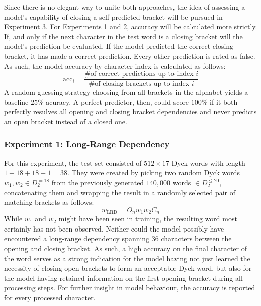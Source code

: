 Since there is no elegant way to unite both approaches, the idea of assessing a model's capability of closing a self-predicted bracket will be pursued in Experiment 3. For Experiments 1 and 2, accuracy will be calculated more strictly. If, and only if the next character in the test word is a closing bracket will the model's prediction be evaluated. If the model predicted the correct closing bracket, it has made a correct prediction. Every other prediction is rated as false. As such, the model accuracy by character index is calculated as follows:
\[
	\text{acc}_{i} = \frac{\text{\# of correct predictions up to index }i}{\text{\# of closing brackets up to index }i}
\]
A random guessing strategy choosing from all brackets in the alphabet yields a baseline $25\%$ acuracy. A perfect predictor, then, could score $100\%$ if it both perfectly resulves all opening and closing bracket dependencies and never predicts an open bracket instead of a closed one.

\subsubsection{Experiment 1: Long-Range Dependency}\label{LRD}
For this experiment, the test set consisted of $512 \times 17$ Dyck words with length $1+18+18+1=38$. They were created by picking two random Dyck words $w_{1}, w_{2} \in D_{2}^{=18}$ from the previously generated $140,000$ words $\in D_{2}^{\leq 20}$, concatenating them and wrapping the result in a randomly selected pair of matching brackets as follows:
\[
	w_{\text{LRD}} = O_{n}w_{1}w_{2}C_{n}
\]
While $w_{1}$ and $w_{2}$ might have been seen in training, the resulting word most certainly has not been observed. Neither could the model possibly have encountered a long-range dependency spanning $36$ characters between the opening and closing bracket. As such, a high accuracy on the final character of the word serves as a strong indication for the model having not just learned the necessity of closing open brackets to form an acceptable Dyck word, but also for the model having retained information on the first opening bracket during all processing steps. For further insight in model behaviour, the accuracy is reported for every processed character.

